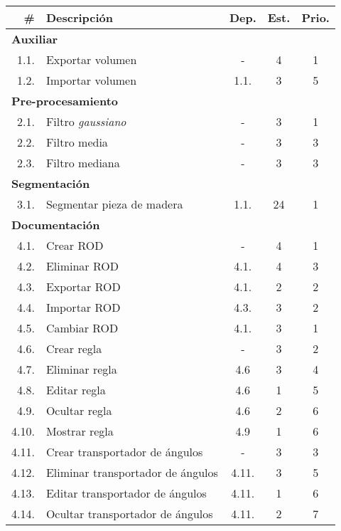 \begin{longtable} {r l c c c}
	\hline
	\#	&	\textbf{Descripción}					&	\textbf{Dep.}	&	\textbf{Est.}	&	\textbf{Prio.}	\\
	\hline \hline
	\endhead
	\multicolumn{5}{l}{\textbf{Auxiliar}} \\
	\hline 
	1.1.	&	Exportar volumen					&	-				&	4				&	1	\\
	\hline
	1.2.	&	Importar volumen					&	1.1.			&	3				&	5	\\
	\hline
	\multicolumn{5}{l}{\textbf{Pre-procesamiento}} \\
	\hline 
	2.1.	&	Filtro \textit{gaussiano}			&	-				&	3				&	1	\\
	\hline
	2.2.	&	Filtro media						&	-				&	3				&	3	\\
	\hline
	2.3.	&	Filtro mediana						&	-				&	3				&	3	\\
	\hline
	\multicolumn{5}{l}{\textbf{Segmentación}} \\
	\hline 
	3.1.	&	Segmentar pieza de madera			&	1.1.			&	24				&	1	\\
	\hline
	\multicolumn{5}{l}{\textbf{Documentación}} \\
	\hline 
	4.1.	&	Crear ROD							&	-				&	4				&	1	\\
	\hline
	4.2.	&	Eliminar ROD						&	4.1.			&	4				&	3	\\
	\hline
	4.3.	&	Exportar ROD						&	4.1.			&	2				&	2	\\
	\hline
	4.4.	&	Importar ROD						&	4.3.			&	3				&	2	\\
	\hline
	4.5.	&	Cambiar ROD							&	4.1.			&	3				&	1	\\
	\hline
	4.6.	&	Crear regla							&	-				&	3				&	2	\\
	\hline
	4.7.	&	Eliminar regla						&	4.6				&	3				&	4	\\
	\hline
	4.8.	&	Editar regla						&	4.6				&	1				&	5	\\
	\hline
	4.9.	&	Ocultar regla						&	4.6				&	2				&	6	\\
	\hline
	4.10.	&	Mostrar regla						&	4.9				&	1				&	6	\\
	\hline
	4.11.	&	Crear transportador de ángulos		&	-				&	3				&	3	\\
	\hline
	4.12.	&	Eliminar transportador de ángulos	&	4.11.			&	3				&	5	\\
	\hline
	4.13.	&	Editar transportador de ángulos		&	4.11.			&	1				&	6	\\
	\hline
	4.14.	&	Ocultar transportador de ángulos	&	4.11.			&	2				&	7	\\

\end{longtable}
